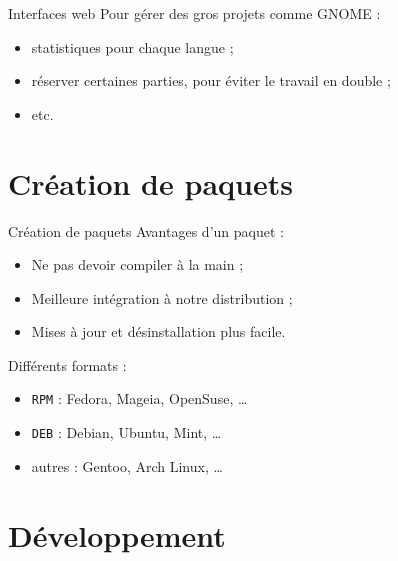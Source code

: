 \documentclass{beamer}
\begin{document}
\begin{frame}{Interfaces web}
  Pour gérer des gros projets comme GNOME :
  \begin{itemize}
    \item statistiques pour chaque langue ;
    \item réserver certaines parties, pour éviter le travail en double ;
    \item etc.
  \end{itemize}
\end{frame}

\section{Création de paquets}
\begin{frame}
  \tableofcontents[sectionstyle=show/shaded, hideothersubsections]
\end{frame}

\begin{frame}{Création de paquets}
  Avantages d'un paquet :
  \begin{itemize}
    \item Ne pas devoir compiler à la main ;
    \item Meilleure intégration à notre distribution ;
    \item Mises à jour et désinstallation plus facile.
  \end{itemize}

  \pause
  \bigskip
  Différents formats :
  \begin{itemize}
    \item \texttt{RPM} : Fedora, Mageia, OpenSuse, …

    \medskip
    \item \texttt{DEB} : Debian, Ubuntu, Mint, …

    \medskip
    \item autres : Gentoo, Arch Linux, …
  \end{itemize}
\end{frame}

\section{Développement}
\begin{frame}
  \tableofcontents[sectionstyle=show/hide, hideothersubsections]
\end{frame}
\end{document}
